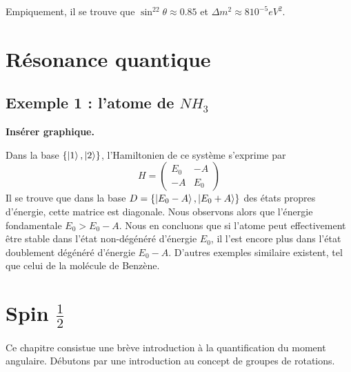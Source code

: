 \documentclass[../notesdecours.tex]{subfiles}
\begin{document}
Empiquement, il se trouve que $\sin^22\theta \approx 0.85$ et $\Delta m^2 \approx 8 10^{-5} eV^2$.



\section{Résonance quantique}

\subsection{Exemple 1 : l'atome de $NH_3$}

\color{red} \textbf{Insérer graphique.} \color{black}

Dans la base $\{\ket{1},\ket{2}\}$, l'Hamiltonien de ce système s'exprime par
\begin{equation}
    H = 
    \begin{pmatrix}
        E_0 & -A\\
        -A & E_0
    \end{pmatrix}
\end{equation}
Il se trouve que dans la base $D = \{\ket{E_0-A},\ket{E_0+A}\}$ des états propres d'énergie, cette matrice est diagonale. Nous observons alors que l'énergie fondamentale $E_0 > E_0-A$. Nous en concluons que si l'atome peut effectivement être stable dans l'état non-dégénéré d'énergie $E_0$, il l'est encore plus dans l'état doublement dégénéré d'énergie $E_0-A$. D'autres exemples similaire existent, tel que celui de la molécule de Benzène.



\section{Spin $\frac{1}{2}$}
Ce chapitre consistue une brève introduction à la quantification du moment angulaire. Débutons par une introduction au concept de groupes de rotations.
\end{document}
